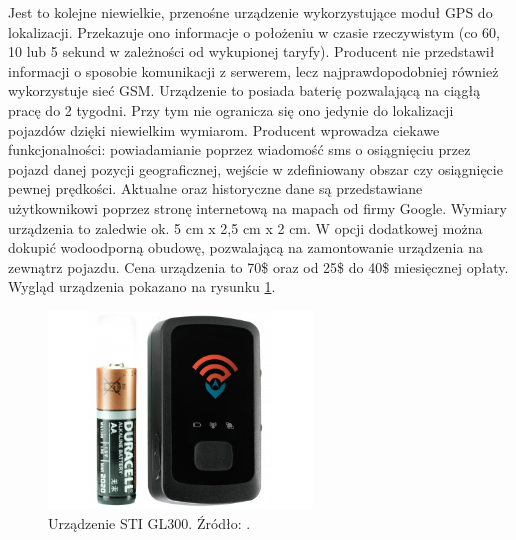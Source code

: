 \begin{itemize}
Jest to kolejne niewielkie, przenośne urządzenie wykorzystujące moduł GPS do lokalizacji. Przekazuje ono informacje o położeniu w czasie rzeczywistym (co 60, 10 lub 5 sekund w zależności od wykupionej taryfy). Producent nie przedstawił informacji o sposobie komunikacji z serwerem, lecz najprawdopodobniej również wykorzystuje sieć GSM. Urządzenie to posiada baterię pozwalającą na ciągłą pracę do 2 tygodni. Przy tym nie ogranicza się ono jedynie do lokalizacji pojazdów dzięki niewielkim wymiarom. Producent wprowadza ciekawe funkcjonalności: powiadamianie poprzez wiadomość sms o osiągnięciu przez pojazd danej pozycji geograficznej, wejście w zdefiniowany obszar czy osiągnięcie pewnej prędkości. Aktualne oraz historyczne dane są przedstawiane użytkownikowi poprzez stronę internetową na mapach od firmy Google. Wymiary urządzenia to zaledwie ok. 5 cm x 2,5 cm x 2 cm.  W opcji dodatkowej można dokupić wodoodporną obudowę, pozwalającą na zamontowanie urządzenia na zewnątrz pojazdu. Cena urządzenia to 70\$ oraz od 25\$ do 40\$ miesięcznej opłaty. Wygląd urządzenia pokazano na rysunku \ref{fig:image_sti_gl300}.
\begin{figure}[h]
	\centering
	\includegraphics[width=7cm]{img/introduction/sti_gl300.jpg}
	\caption{Urządzenie STI GL300. Źródło: \cite{gl300}.}
	\label{fig:image_sti_gl300}
\end{figure}
\end{itemize}